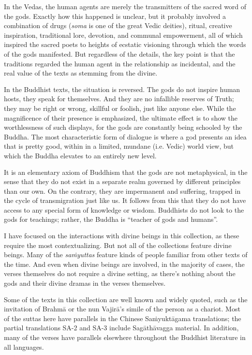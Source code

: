 \documentclass[12pt,openany]{book}%
\begin{document}
In the Vedas, the human agents are merely the transmitters of the sacred word of the gods. Exactly how this happened is unclear, but it probably involved a combination of drugs (\textit{soma} is one of the great Vedic deities), ritual, creative inspiration, traditional lore, devotion, and communal empowerment, all of which inspired the sacred poets to heights of ecstatic visioning through which the words of the gods manifested. But regardless of the details, the key point is that the traditions regarded the human agent in the relationship as incidental, and the real value of the texts as stemming from the divine.

In the Buddhist texts, the situation is reversed. The gods do not inspire human hosts, they speak for themselves. And they are no infallible reserves of Truth; they may be right or wrong, skillful or foolish, just like anyone else. While the magnificence of their presence is emphasized, the ultimate effect is to show the worthlessness of such displays, for the gods are constantly being schooled by the Buddha. The most characteristic form of dialogue is where a god presents an idea that is pretty good, within in a limited, mundane (i.e. Vedic) world view, but which the Buddha elevates to an entirely new level.

It is an elementary axiom of Buddhism that the gods are not metaphysical, in the sense that they do not exist in a separate realm governed by different principles than our own. On the contrary, they are impermanent and suffering, trapped in the cycle of transmigration just like us. It follows from this that they do not have access to any special form of knowledge or wisdom. Buddhists do not look to the gods for teachings; rather, the Buddha is “teacher of gods and humans”.

I have focused on the interactions with divine beings in this collection, as these require the most contextualizing. But not all of the collections feature divine beings. Many of the \textit{\textsanskrit{saṁyuttas}} feature kinds of people familiar from other texts of the time. And even when divine beings are involved, in the majority of cases, the verses themselves do not require a divine setting, as there’s nothing about the gods and their divine dramas in the verses themselves.

Some of the texts in this collection are well known and widely quoted, such as the invitation of \textsanskrit{Brahmā} or the nun \textsanskrit{Vajirā}’s simile of the person as a chariot. Most of the suttas here have parallels in the Chinese \textsanskrit{Saṁyuktāgama} translations; the partial translations SA-2 and SA-3 include \textsanskrit{Sagāthāvagga} material. In addition, many of the verses have parallels elsewhere throughout the Buddhist literature in all languages.
\end{document}
